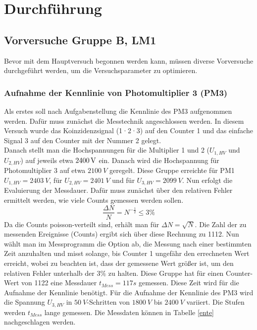 \section{Durchführung}
    \subsection{Vorversuche Gruppe B, LM1}
        Bevor mit dem Hauptversuch begonnen werden kann, müssen diverse Vorversuche durchgeführt werden, um die Versuchsparameter zu optimieren.
        \subsubsection{Aufnahme der Kennlinie von Photomultiplier 3 (PM3)}
            Als erstes soll nach Aufgabenstellung die Kennlinie des PM3 aufgenommen werden. Dafür muss zunächst die Messtechnik angeschlossen werden. In diesem Versuch wurde das Koinzidenzsignal (1·2·3) auf den Counter 1 und das einfache Signal 3 auf den Counter mit der Nummer 2 gelegt.\\
            Danach stellt man die Hochspannungen für die Multiplier 1 und 2 ($U_{1,HV}$ und $U_{2,HV}$) auf jeweils etwa $\unit[2400]{V}$ ein. Danach wird die Hochspannung für Photomultiplier 3 auf etwa $2100\ \unit{V}$ geregelt. Diese Gruppe erreichte für PM1 $U_{1,HV} = 2403\ \unit{V}$, für $U_{2,HV} = 2401\ \unit{V}$ und für $U_{3,HV} = 2099\ \unit{V}$. 
            Nun erfolgt die Evaluierung der Messdauer. Dafür muss zunächst über den relativen Fehler ermittelt werden, wie viele Counts gemessen werden sollen. 
            $$ \frac{\Delta N}{N} = N^{-\frac{1}{2}} \leq 3\unit{\%}$$
            Da die Counts poisson-verteilt sind, erhält man für $\Delta N = \sqrt{N}$. Die Zahl der zu messenden Ereignisse (Counts) ergibt sich über diese Rechnung zu 1112. Nun wählt man im Messprogramm die Option ab, die Messung nach einer bestimmten Zeit anzuhalten und misst solange, bis Counter 1 ungefähr den errechneten Wert erreicht, wobei zu beachten ist, dass der gemessene Wert größer ist, um den relativen Fehler unterhalb der $3\unit{\%}$ zu halten. Diese Gruppe hat für einen Counter-Wert von 1122 eine Messdauer $t_{Mess} = 117\unit{s}$ gemessen. Diese Zeit wird für die Aufnahme der Kennlinie benötigt.
            Für die Aufnahme der Kennlinie des PM3 wird die Spannung $U_{3,HV}$ in $50\ \unit{V}$-Schritten von $1800\ \unit{V}$ bis $2400\ \unit{V}$ variiert. Die Stufen werden $t_{Mess}$ lange gemessen. Die Messdaten können in Tabelle \ref{ente} nachgeschlagen werden. 
